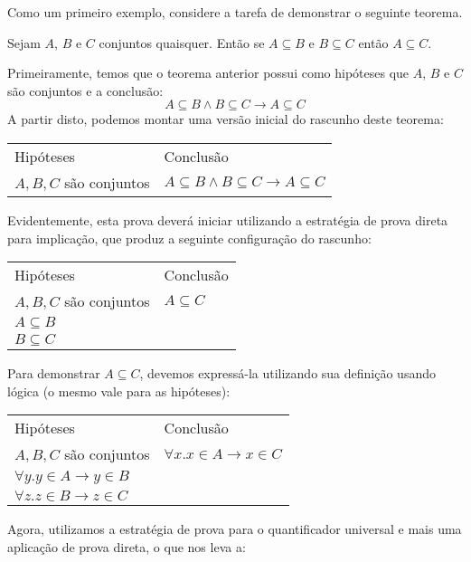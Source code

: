 \begin{Example}
Como um primeiro exemplo, considere a tarefa de demonstrar o seguinte
teorema.
\begin{flushleft}
Sejam $A$, $B$ e $C$ conjuntos quaisquer. Então se $A\subseteq B$ e
$B\subseteq C$ então $A\subseteq C$.
\end{flushleft}
Primeiramente, temos que o teorema anterior possui como hipóteses que
$A$, $B$ e $C$ são conjuntos e a conclusão:
\[
A\subseteq B \land B \subseteq C \to A \subseteq C
\]
A partir disto, podemos montar uma versão inicial do rascunho deste
teorema:
\begin{flushleft}
  \begin{tabular}{ll}
        Hipóteses & Conclusão \\
        $A,B,C$ são conjuntos & $A\subseteq B \land B \subseteq C \to
        A \subseteq C$\\
  \end{tabular}
\end{flushleft}
Evidentemente, esta prova deverá iniciar utilizando a estratégia de
prova direta para implicação, que produz a seguinte configuração do
rascunho:
\begin{flushleft}
  \begin{tabular}{ll}
        Hipóteses & Conclusão \\
        $A,B,C$ são conjuntos & $A \subseteq C$\\
        $A\subseteq B$ & \\
       $B \subseteq C$ & \\
  \end{tabular}
\end{flushleft}
Para demonstrar $A\subseteq C$, devemos expressá-la utilizando sua
definição usando lógica (o mesmo vale para as hipóteses):
\begin{flushleft}
  \begin{tabular}{ll}
        Hipóteses & Conclusão \\
        $A,B,C$ são conjuntos & $\forall x. x\in A \to x \in C$\\
        $\forall y. y\in A \to y \in B$ & \\
       $\forall z. z \in B \to z \in C$ & \\
  \end{tabular}
\end{flushleft}
Agora, utilizamos a estratégia de prova para o quantificador universal
e mais uma aplicação de prova direta, o que nos leva a:
\begin{flushleft}

\end{flushleft}
\end{Example}
